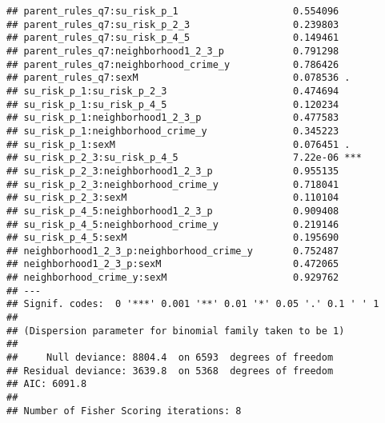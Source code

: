 \documentclass[
]{article}
\newenvironment{Shaded}{\begin{snugshade}}{\end{snugshade}}
\newcommand{\FloatTok}[1]{\textcolor[rgb]{0.00,0.00,0.81}{#1}}
\newcommand{\FunctionTok}[1]{\textcolor[rgb]{0.00,0.00,0.00}{#1}}
\newcommand{\NormalTok}[1]{#1}
\newcommand{\OtherTok}[1]{\textcolor[rgb]{0.56,0.35,0.01}{#1}}
\newcommand{\SpecialCharTok}[1]{\textcolor[rgb]{0.00,0.00,0.00}{#1}}
\begin{document}
\begin{verbatim}
## parent_rules_q7:su_risk_p_1                    0.554096    
## parent_rules_q7:su_risk_p_2_3                  0.239803    
## parent_rules_q7:su_risk_p_4_5                  0.149461    
## parent_rules_q7:neighborhood1_2_3_p            0.791298    
## parent_rules_q7:neighborhood_crime_y           0.786426    
## parent_rules_q7:sexM                           0.078536 .  
## su_risk_p_1:su_risk_p_2_3                      0.474694    
## su_risk_p_1:su_risk_p_4_5                      0.120234    
## su_risk_p_1:neighborhood1_2_3_p                0.477583    
## su_risk_p_1:neighborhood_crime_y               0.345223    
## su_risk_p_1:sexM                               0.076451 .  
## su_risk_p_2_3:su_risk_p_4_5                    7.22e-06 ***
## su_risk_p_2_3:neighborhood1_2_3_p              0.955135    
## su_risk_p_2_3:neighborhood_crime_y             0.718041    
## su_risk_p_2_3:sexM                             0.110104    
## su_risk_p_4_5:neighborhood1_2_3_p              0.909408    
## su_risk_p_4_5:neighborhood_crime_y             0.219146    
## su_risk_p_4_5:sexM                             0.195690    
## neighborhood1_2_3_p:neighborhood_crime_y       0.752487    
## neighborhood1_2_3_p:sexM                       0.472065    
## neighborhood_crime_y:sexM                      0.929762    
## ---
## Signif. codes:  0 '***' 0.001 '**' 0.01 '*' 0.05 '.' 0.1 ' ' 1
## 
## (Dispersion parameter for binomial family taken to be 1)
## 
##     Null deviance: 8804.4  on 6593  degrees of freedom
## Residual deviance: 3639.8  on 5368  degrees of freedom
## AIC: 6091.8
## 
## Number of Fisher Scoring iterations: 8
\end{verbatim}

\begin{Shaded}
\end{Shaded}
\end{document}

